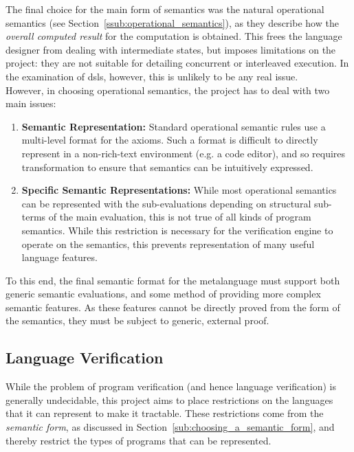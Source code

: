 The final choice for the main form of semantics was the natural operational semantics (see Section~\ref{ssub:operational_semantics}), as they describe how the \textit{overall computed result} for the computation is obtained.
This frees the language designer from dealing with intermediate states, but imposes limitations on the project: they are not suitable for detailing concurrent or interleaved execution.
In the examination of \glspl{dsl}, however, this is unlikely to be any real issue.\\

However, in choosing operational semantics, the project has to deal with two main issues:
\begin{enumerate}
    \item \textbf{Semantic Representation:} Standard operational semantic rules use a multi-level format for the axioms.
    Such a format is difficult to directly represent in a non-rich-text environment (e.g. a code editor), and so requires transformation to ensure that semantics can be intuitively expressed.
    \item \textbf{Specific Semantic Representations:} While most operational semantics can be represented with the sub-evaluations depending on structural sub-terms of the main evaluation, this is not true of all kinds
    of program semantics.
    While this restriction is necessary for the verification engine to operate on the semantics, this prevents representation of many useful language features.
\end{enumerate}

To this end, the final semantic format for the metalanguage must support both generic semantic evaluations, and some method of providing more complex semantic features.
As these features cannot be directly proved from the form of the semantics, they must be subject to generic, external proof. 


\subsection{Language Verification} %
\label{sub:language_verification}
While the problem of program verification (and hence language verification) is generally undecidable, this project aims to place restrictions on the languages that it can represent to make it tractable. 
These restrictions come from the \textit{semantic form}, as discussed in Section~\ref{sub:choosing_a_semantic_form}, and thereby restrict the types of programs that can be represented.

